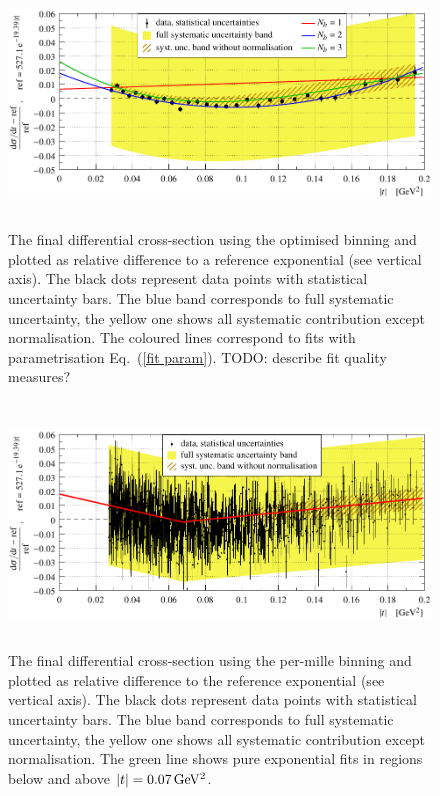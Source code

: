 \documentclass[twocolumn,a4paper,superscriptaddress,preprintnumbers,showpacs,nofootinbib]{revtex4-1}
\def\un#1{\,{\rm #1}}
\begin{document}
\begin{figure}
\vskip-5mm
\begin{center}
\includegraphics[height=6.5cm]{fig/t_dist_rel_with_fits.pdf}
\vskip-6mm
\caption{%
The final differential cross-section using the optimised binning and plotted as relative difference to a reference exponential (see vertical axis). The black dots represent data points with statistical uncertainty bars. The blue band corresponds to full systematic uncertainty, the yellow one shows all systematic contribution except normalisation. The coloured lines correspond to fits with parametrisation Eq.~(\ref{fit param}).
TODO: describe fit quality measures?}
\label{fig:data rel ob}
\end{center}
\vskip-2mm
\end{figure}

\begin{figure}
\begin{center}
\includegraphics[height=6.5cm]{fig/t_dist_rel_with_split_fit.pdf}
\vskip-6mm
\caption{
The final differential cross-section using the per-mille binning and plotted as relative difference to the reference exponential (see vertical axis). The black dots represent data points with statistical uncertainty bars. The blue band corresponds to full systematic uncertainty, the yellow one shows all systematic contribution except normalisation. The green line shows pure exponential fits in regions below and above $|t| = 0.07\un{GeV^2}$.
}
\label{fig:data rel cpb0.001}
\end{center}
\end{figure}
\end{document}
